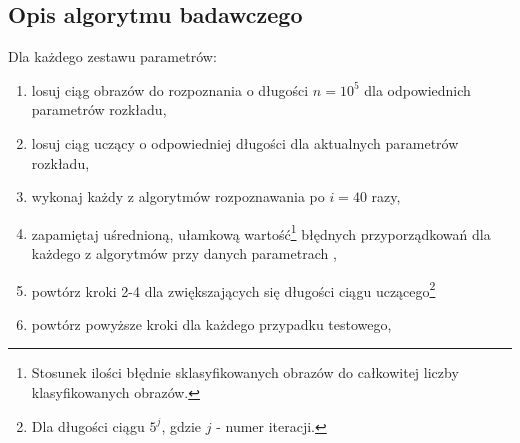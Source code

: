 	\subsection{Opis algorytmu badawczego}
	
	Dla każdego zestawu parametrów:
	\begin{enumerate}
	\item losuj ciąg obrazów do rozpoznania o długości $n = 10^5$ dla odpowiednich parametrów rozkładu,
	\item losuj ciąg uczący o odpowiedniej długości dla aktualnych parametrów rozkładu,
	\item wykonaj każdy z algorytmów rozpoznawania po $i = 40$  razy,
	\item zapamiętaj uśrednioną, ułamkową wartość\footnote{Stosunek ilości błędnie sklasyfikowanych obrazów do całkowitej liczby klasyfikowanych obrazów.} błędnych przyporządkowań dla każdego z algorytmów przy danych parametrach ,
	\item powtórz kroki 2-4 dla zwiększających się długości ciągu uczącego\footnote{Dla długości ciągu $5^j$, gdzie $j$ - numer iteracji.}
	\item powtórz powyższe kroki dla każdego przypadku testowego,
	\end{enumerate}